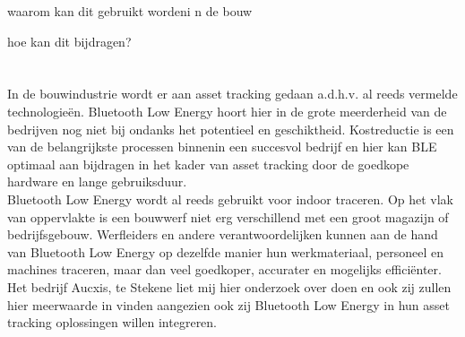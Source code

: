 waarom kan dit gebruikt wordeni n de bouw

hoe kan dit bijdragen?






\section{}%
\label{sec:probleemstelling}


In de bouwindustrie wordt er aan asset tracking gedaan a.d.h.v. al reeds vermelde technologieën. Bluetooth Low Energy hoort hier in de grote meerderheid van de bedrijven nog niet bij ondanks het potentieel en geschiktheid. Kostreductie is een van de belangrijkste processen binnenin een succesvol bedrijf en hier kan BLE optimaal aan bijdragen  in het kader van asset tracking door de goedkope hardware en lange gebruiksduur.\\

Bluetooth Low Energy wordt al reeds gebruikt voor indoor traceren. Op het vlak van oppervlakte is een bouwwerf niet erg verschillend met een groot magazijn of bedrijfsgebouw.
Werfleiders en andere verantwoordelijken kunnen aan de hand van Bluetooth Low Energy op dezelfde manier hun werkmateriaal, personeel en machines traceren, maar dan veel goedkoper, accurater en mogelijks efficiënter. \\

Het bedrijf Aucxis, te Stekene liet mij hier onderzoek over doen en ook zij zullen hier meerwaarde in vinden aangezien ook zij Bluetooth Low Energy in hun asset tracking oplossingen willen integreren.

\section{}%
\label{sec:onderzoeksvraag}

